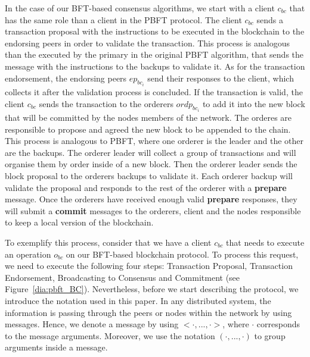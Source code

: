 \documentclass[conference]{llncs}
\begin{document}
In the case of our BFT-based consensus algorithms, we start with a client $c_{bc}$ that has the same role than a client in the PBFT protocol. The client $c_{bc}$ sends a transaction proposal with the instructions to be executed in the blockchain to the endorsing peers in order to validate the transaction. This process is analogous than the executed by the primary in the original PBFT algorithm, that sends the message with the instructions to the backups to validate it. As for the transaction endorsement, the endorsing peers $ep_{bc_{i}}$ send their responses to the client, which collects it after the validation process is concluded. If the transaction is valid, the client $c_{bc}$ sends the transaction to the orderers $ordp_{bc_{i}}$ to add it into the new block that will be committed by the nodes members of the network. The orderes are responsible to propose and agreed the new block to be appended to the chain. This process is analogous to PBFT, where one orderer is the leader and the other are the backups. The orderer leader will collect a group of transactions and will organise them by order inside of a new block. Then the orderer leader sends the block proposal to the orderers backups to validate it. Each orderer backup will validate the proposal and responds to the rest of the orderer with a \textbf{prepare} message. Once the orderers have received enough valid \textbf{prepare} responses, they will submit a \textbf{commit} messages to the orderers, client and the nodes responsible to keep a local version of the blockchain. 

To exemplify this process, consider that we have a client $c_{bc}$ that needs to execute an operation $o_{bc}$ on our BFT-based blockchain protocol. To process this request, we need to execute the following four steps: Transaction Proposal, Transaction Endorsement, Broadcasting to Consensus and Commitment (see Figure~\ref{dia:pbft_BC}). Nevertheless,  before we start describing the protocol, we introduce the notation used in this paper. In any distributed system, the information is passing through the peers or nodes within the network by using messages. Hence, we  denote a message by using $<\cdot,...,\cdot>$, where $\cdot$ corresponds to the message arguments. Moreover, we use the notation $(\cdot,...,\cdot)$ to group arguments inside a message.
\end{document}
